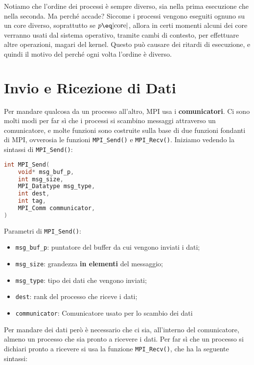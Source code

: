 Notiamo che l'ordine dei processi è sempre diverso, sia nella prima esecuzione che nella seconda. Ma perché accade? Siccome i processi vengono eseguiti ognuno su un core diverso, soprattutto se $p \eq |\text{core}|$, allora in certi momenti alcuni dei core verranno usati dal sistema operativo, tramite cambi di contesto, per effettuare altre operazioni, magari del kernel. Questo può causare dei ritardi di esecuzione, e quindi il motivo del perché ogni volta l'ordine è diverso.

\section{Invio e Ricezione di Dati}

Per mandare qualcosa da un processo all'altro, MPI usa i \textbf{comunicatori}. Ci sono molti modi per far sì che i processi si scambino messaggi attraverso un comunicatore, e molte funzioni sono costruite sulla base di due funzioni fondanti di MPI, ovverosia le funzioni \verb|MPI_Send()| e \verb|MPI_Recv()|. Iniziamo vedendo la sintassi di \verb|MPI_Send()|:

\begin{codedefine}
    \begin{lstlisting}[language = C, numbers = none]
int MPI_Send(
    void* msg_buf_p,
    int msg_size,
    MPI_Datatype msg_type,
    int dest,
    int tag,
    MPI_Comm communicator,
)\end{lstlisting}
    \manlower    
    Parametri di \verb|MPI_Send()|:
    \begin{itemize}
        \item \verb|msg_buf_p|: puntatore del buffer da cui vengono inviati i dati;
        \item \verb|msg_size|: grandezza \textbf{in elementi} del messaggio;
        \item \verb|msg_type|: tipo dei dati che vengono inviati;
        \item \verb|dest|: rank del processo che riceve i dati;
        \item \verb|communicator|: Comunicatore usato per lo scambio dei dati
    \end{itemize}
\end{codedefine}

Per mandare dei dati però è necessario che ci sia, all'interno del comunicatore, almeno un processo che sia pronto a ricevere i dati. Per far sì che un processo si dichiari pronto a ricevere si usa la funzione \verb|MPI_Recv()|, che ha la seguente sintassi:

